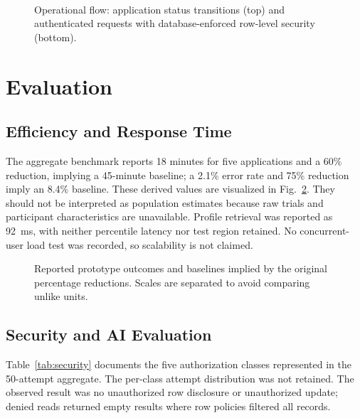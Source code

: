 \documentclass[conference,letterpaper]{IEEEtran}
\begin{document}
\begin{figure}[!t]
\centering
\resizebox{0.94\columnwidth}{!}{}\\[3pt]
\resizebox{0.62\columnwidth}{!}{}
\caption{Operational flow: application status transitions (top) and authenticated requests with database-enforced row-level security (bottom).}
\label{fig:operations}
\end{figure}

\section{Evaluation}
\subsection{Efficiency and Response Time}
The aggregate benchmark reports 18 minutes for five applications and a 60\% reduction, implying a 45-minute baseline; a 2.1\% error rate and 75\% reduction imply an 8.4\% baseline. These derived values are visualized in Fig.~\ref{fig:performance}. They should not be interpreted as population estimates because raw trials and participant characteristics are unavailable. Profile retrieval was reported as 92~ms, with neither percentile latency nor test region retained. No concurrent-user load test was recorded, so scalability is not claimed.

\begin{figure}[!t]
\centering

\caption{Reported prototype outcomes and baselines implied by the original percentage reductions. Scales are separated to avoid comparing unlike units.}
\label{fig:performance}
\end{figure}

\subsection{Security and AI Evaluation}
Table~\ref{tab:security} documents the five authorization classes represented in the 50-attempt aggregate. The per-class attempt distribution was not retained. The observed result was no unauthorized row disclosure or unauthorized update; denied reads returned empty results where row policies filtered all records.
\end{document}
